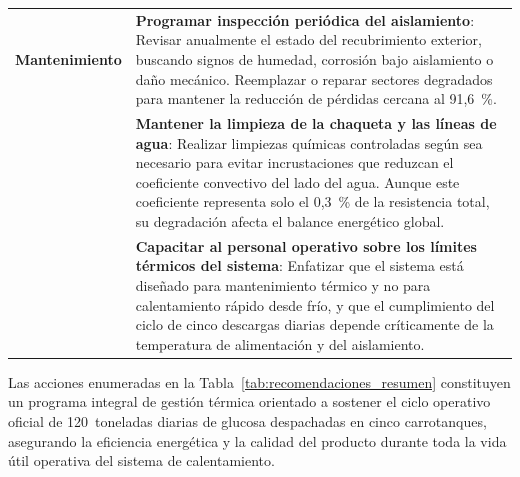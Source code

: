 {\begin{longtable}{@{}p{2.2cm}p{13.3cm}@{}}
\midrule
\textbf{Mantenimiento}
& \textbf{Programar inspecci\'on peri\'odica del aislamiento}: Revisar anualmente el estado del recubrimiento exterior, buscando signos de humedad, corrosi\'on bajo aislamiento o da\~no mec\'anico. Reemplazar o reparar sectores degradados para mantener la reducci\'on de p\'erdidas cercana al 91,6~\%. \\
& \textbf{Mantener la limpieza de la chaqueta y las l\'ineas de agua}: Realizar limpiezas qu\'imicas controladas seg\'un sea necesario para evitar incrustaciones que reduzcan el coeficiente convectivo del lado del agua. Aunque este coeficiente representa solo el 0,3~\% de la resistencia total, su degradaci\'on afecta el balance energ\'etico global. \\
& \textbf{Capacitar al personal operativo sobre los l\'imites t\'ermicos del sistema}: Enfatizar que el sistema est\'a dise\~nado para mantenimiento t\'ermico y no para calentamiento r\'apido desde fr\'io, y que el cumplimiento del ciclo de cinco descargas diarias depende cr\'iticamente de la temperatura de alimentaci\'on y del aislamiento. \\
\end{longtable}
}

Las acciones enumeradas en la Tabla~\ref{tab:recomendaciones_resumen} constituyen un programa integral de gesti\'on t\'ermica orientado a sostener el ciclo operativo oficial de 120~toneladas diarias de glucosa despachadas en cinco carrotanques, asegurando la eficiencia energ\'etica y la calidad del producto durante toda la vida \'util operativa del sistema de calentamiento.
